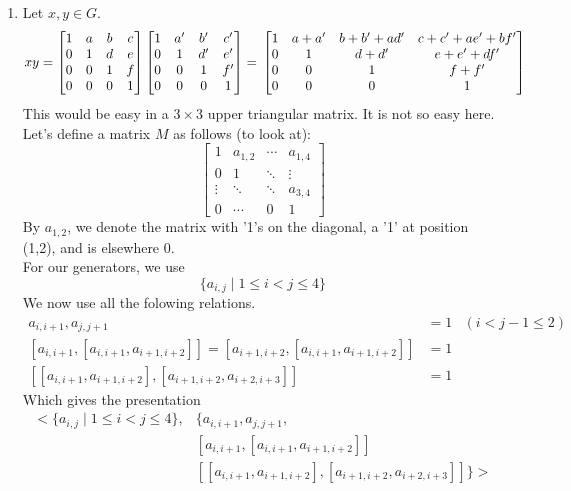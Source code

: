 \documentclass{article}
\theoremstyle{definition}
\theoremstyle{remark}
\theoremstyle{example}
\begin{document}
\begin{enumerate}
		\pagebreak
	
	
		\item Let $x,y \in G$. \[xy=\begin{bmatrix}
			1 & a & b & c\\
			0 & 1 & d & e\\
			0 & 0 & 1 & f\\
			0 & 0 & 0 & 1
		\end{bmatrix}
		\begin{bmatrix}
			1 & a' & b' & c'\\
			0 & 1 & d' & e'\\
			0 & 0 & 1 & f'\\
			0 & 0 & 0 & 1
		\end{bmatrix}=\\
		\begin{bmatrix}
			1 & a+a' & b+b'+ad'& c+c'+ae'+bf'\\
			0 & 1 & d+d' & e+e'+df'\\
			0 & 0 & 1 & f+f'\\
			0 & 0 & 0 & 1
		\end{bmatrix}\]
		This would be easy in a $3 \times 3$ upper triangular matrix. It is not so easy here.\\
		Let's define a matrix $M$ as follows (to look at):
		\[
		\begin{bmatrix}
			1 & a_{1,2} & \cdots & a_{1,4}\\
			0 & 1 & \ddots & \vdots\\
			\vdots & \ddots & \ddots & a_{3,4}\\
			0 & \cdots & 0 & 1
		\end{bmatrix}\]
		By $a_{1,2}$, we denote the matrix with '1's on the diagonal, a '1' at position (1,2), and is elsewhere 0.\\
		For our generators, we use \[\{a_{i,j} \mid 1 \leq i < j \leq 4\}\]
		We now use all the folowing relations.
		\begin{align*}
		a_{i,i+1},a_{j,j+1}&=1 & (i<j-1 \leq 2)\\
		[a_{i,i+1},[a_{i,i+1},a_{i+1,i+2}]]=[a_{i+1,i+2},[a_{i,i+1},a_{i+1,i+2}]]& = 1 \\
		[[a_{i,i+1},a_{i+1,i+2}],[a_{i+1,i+2},a_{i+2,i+3}]]&=1
		\end{align*}
		Which gives the presentation \begin{align*}
		<\{a_{i,j} \mid 1 \leq i < j \leq 4\},&\{a_{i,i+1},a_{j,j+1},\\
		&[a_{i,i+1},[a_{i,i+1},a_{i+1,i+2}]]\\
		&[[a_{i,i+1},a_{i+1,i+2}],[a_{i+1,i+2},a_{i+2,i+3}]]\}>
		\end{align*}
	\end{enumerate}

	
\end{document}
